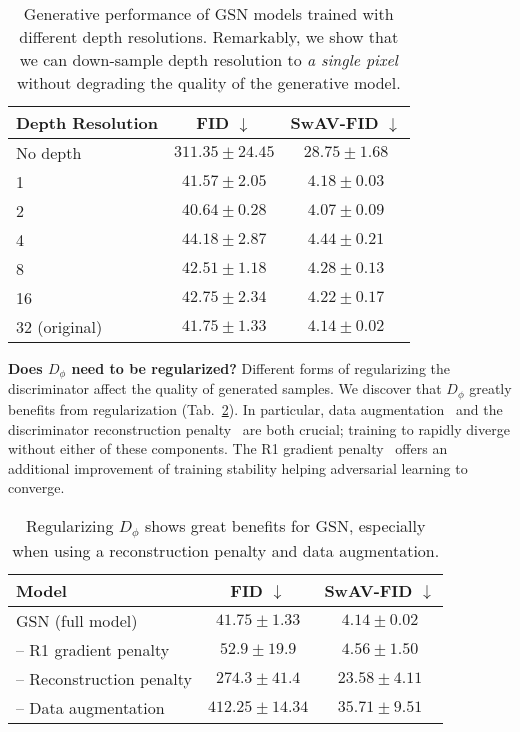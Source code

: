 \documentclass[10pt,twocolumn,letterpaper]{article}
\begin{document}
\begin{table}[h]
\small
\begin{center}
 \begin{tabular}{lcc}
 \toprule
 Depth Resolution & FID $\downarrow$ & SwAV-FID $\downarrow$ \\
 \midrule
 No depth & $311.35 \pm 24.45$ & $28.75 \pm 1.68$ \\
 1 & $41.57 \pm 2.05$ & $4.18 \pm 0.03$ \\
 2 & $40.64 \pm 0.28$ & $4.07 \pm 0.09$ \\
 4 & $44.18 \pm 2.87$ & $4.44 \pm 0.21$ \\
 8 & $42.51 \pm 1.18$ & $4.28 \pm 0.13$ \\
 16 & $42.75 \pm 2.34$ & $4.22 \pm 0.17$\\
 32 (original) & $41.75 \pm 1.33$ & $4.14 \pm 0.02$ \\
 \bottomrule
\end{tabular}
\end{center}
\caption{Generative performance of GSN models trained with different depth resolutions. Remarkably, we show that we can down-sample depth resolution to \textit{a single pixel} without degrading the quality of the generative model.}
\label{tab:depth_resolution}
\end{table}

\textbf{Does $D_\phi$ need to be regularized?} Different forms of regularizing the discriminator affect the quality of generated samples. We discover that $D_\phi$ greatly benefits from regularization (Tab.~\ref{tab:regularizer_ablation}). In particular, data augmentation~\cite{diffaugment} and the discriminator reconstruction penalty~\cite{self_supervised_discriminator} are both crucial; training to rapidly diverge without either of these components. The R1 gradient penalty~\cite{r1} offers an additional improvement of training stability helping adversarial learning to converge.

\begin{table}[h]
\small
\begin{center}
 \begin{tabular}{lcc}
 \toprule
 Model & FID $\downarrow$ & SwAV-FID $\downarrow$ \\
 \midrule
 GSN (full model) & $41.75 \pm 1.33$ & $4.14 \pm 0.02$ \\
  \quad -- R1 gradient penalty & $52.9 \pm 19.9$ & $4.56 \pm 1.50$\\
 \quad -- Reconstruction penalty & $274.3 \pm 41.4$ & $23.58 \pm 4.11$\\
 \quad -- Data augmentation & $412.25 \pm 14.34$ &  $35.71 \pm 9.51$\\
 \bottomrule

\end{tabular}
\end{center}
\caption{Regularizing $D_\phi$ shows great benefits for GSN, especially when using a reconstruction penalty and data augmentation.}
\label{tab:regularizer_ablation}
\end{table}
\end{document}
